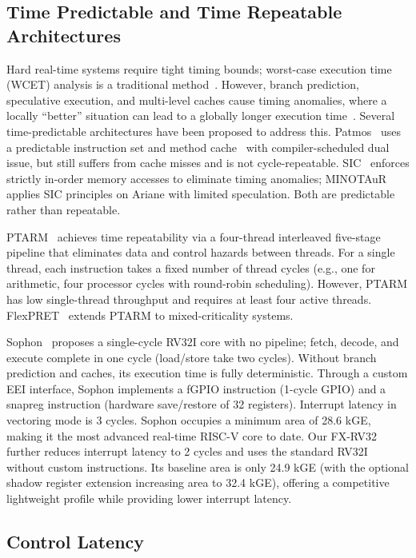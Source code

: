 \documentclass[letterpaper,journal]{IEEEtran}
\begin{document}
\subsection{Time Predictable and Time Repeatable Architectures}
Hard real-time systems require tight timing bounds; worst-case execution time (WCET) analysis is a traditional method~\cite{ref7}.
However, branch prediction, speculative execution, and multi-level caches cause timing anomalies, where a locally ``better'' situation can lead to a globally longer execution time~\cite{ref3}.
Several time-predictable architectures have been proposed to address this.
Patmos~\cite{ref8} uses a predictable instruction set and method cache~\cite{ref9} with compiler-scheduled dual issue, but still suffers from cache misses and is not cycle-repeatable.
SIC~\cite{ref3} enforces strictly in-order memory accesses to eliminate timing anomalies; MINOTAuR~\cite{ref4} applies SIC principles on Ariane with limited speculation.
Both are predictable rather than repeatable.

PTARM~\cite{ref2} achieves time repeatability via a four-thread interleaved five-stage pipeline that eliminates data and control hazards between threads.
For a single thread, each instruction takes a fixed number of thread cycles (e.g., one for arithmetic, four processor cycles with round-robin scheduling).
However, PTARM has low single-thread throughput and requires at least four active threads.
FlexPRET~\cite{ref12} extends PTARM to mixed-criticality systems.

Sophon~\cite{ref1} proposes a single-cycle RV32I core with no pipeline; fetch, decode, and execute complete in one cycle (load/store take two cycles).
Without branch prediction and caches, its execution time is fully deterministic.
Through a custom EEI interface, Sophon implements a fGPIO instruction (1-cycle GPIO) and a snapreg instruction (hardware save/restore of 32 registers).
Interrupt latency in vectoring mode is 3 cycles.
Sophon occupies a minimum area of 28.6 kGE, making it the most advanced real-time RISC-V core to date.
Our FX-RV32 further reduces interrupt latency to 2 cycles and uses the standard RV32I without custom instructions.
Its baseline area is only 24.9 kGE (with the optional shadow register extension increasing area to 32.4 kGE), offering a competitive lightweight profile while providing lower interrupt latency.

\subsection{Control Latency}
\end{document}
